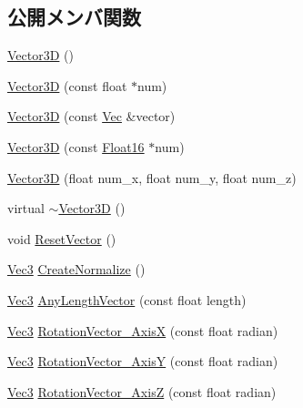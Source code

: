 \subsection*{公開メンバ関数}
\begin{DoxyCompactItemize}
\item 
\mbox{\hyperlink{class_vector3_d_a0b11a8d75da427b27443d8a94d0d296c}{Vector3D}} ()
\item 
\mbox{\hyperlink{class_vector3_d_a8021647d8191d446485dc153e49809b2}{Vector3D}} (const float $\ast$num)
\item 
\mbox{\hyperlink{class_vector3_d_a446893e1b89f6e60ea16cf30ef0a3afc}{Vector3D}} (const \mbox{\hyperlink{_vector3_d_8h_a1f0b707f0d418d6cc74484019e41e55d}{Vec}} \&vector)
\item 
\mbox{\hyperlink{class_vector3_d_af5bdf4c49bc5804bb8aaa56f08007553}{Vector3D}} (const \mbox{\hyperlink{_vector3_d_8h_afe61185afc2bf3856c12613d99eede01}{Float16}} $\ast$num)
\item 
\mbox{\hyperlink{class_vector3_d_a01f2964e8b01e8e146eb4eca9ad36d2b}{Vector3D}} (float num\+\_\+x, float num\+\_\+y, float num\+\_\+z)
\item 
virtual \mbox{\hyperlink{class_vector3_d_ae4fde5759270bf5bcf615f12f0823a8c}{$\sim$\+Vector3D}} ()
\item 
void \mbox{\hyperlink{class_vector3_d_a9cfe261f14b3b2e6704c5649058d3ecd}{Reset\+Vector}} ()
\item 
\mbox{\hyperlink{_vector3_d_8h_ab16f59e4393f29a01ec8b9bbbabbe65d}{Vec3}} \mbox{\hyperlink{class_vector3_d_ae55e42c07bdfcc6c11bcbc6bf5e27808}{Create\+Normalize}} ()
\item 
\mbox{\hyperlink{_vector3_d_8h_ab16f59e4393f29a01ec8b9bbbabbe65d}{Vec3}} \mbox{\hyperlink{class_vector3_d_a030384bdfe25863cd4be77fa73052cf1}{Any\+Length\+Vector}} (const float length)
\item 
\mbox{\hyperlink{_vector3_d_8h_ab16f59e4393f29a01ec8b9bbbabbe65d}{Vec3}} \mbox{\hyperlink{class_vector3_d_a0b058c605bbea7ea97bd96efa3c0bc26}{Rotation\+Vector\+\_\+\+AxisX}} (const float radian)
\item 
\mbox{\hyperlink{_vector3_d_8h_ab16f59e4393f29a01ec8b9bbbabbe65d}{Vec3}} \mbox{\hyperlink{class_vector3_d_a0a8556c9bd5caef8592174a8c095080f}{Rotation\+Vector\+\_\+\+AxisY}} (const float radian)
\item 
\mbox{\hyperlink{_vector3_d_8h_ab16f59e4393f29a01ec8b9bbbabbe65d}{Vec3}} \mbox{\hyperlink{class_vector3_d_ac893f738dde87e5981dcff5d5515ede6}{Rotation\+Vector\+\_\+\+AxisZ}} (const float radian)

\end{DoxyCompactItemize}
